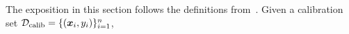 The exposition in this section follows the definitions from~\citet{angelopoulos2021learn}.
Given a calibration set ${\mathcal{D}}_{\text{calib}} = \{({\bm{x}}_i, y_i)\}_{i=1}^n$,
